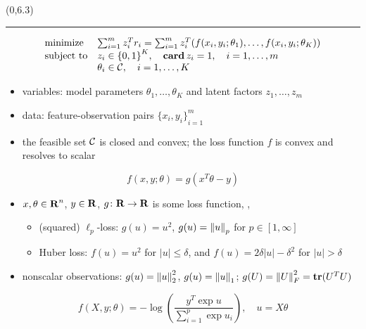 \documentclass[a0]{a0poster}
\begin{document}
\begin{textblock}{7}(0,6.3)
    \hrule\vspace*{0.5\baselineskip}

    \begin{equation}\label{prob:std_dlfm}
        \begin{array}{ll}
            \mbox{minimize} & \sum_{i = 1}^{m} z_i^T r_i = \sum_{i = 1}^{m} z_i^T (f(x_i, y_i; \theta_1), \ldots, f(x_i, y_i; \theta_K))\\
            \mbox{subject to} & z_i \in {\{0, 1\}}^K,\quad \mathop{\bf card} z_i = 1,\quad i = 1, \ldots, m\\
            & \theta_i \in {\cal C{}},\quad i = 1, \ldots, K
        \end{array}
    \end{equation}
    \begin{itemize}
        \item variables: model parameters $\theta_1, \ldots, \theta_K$ and latent factors $z_1, \ldots, z_m$
        \item data: feature-observation pairs ${\{x_i, y_i\}}_{i = 1}^m$
        \item the feasible set ${\cal C{}}$ is closed and convex; the loss function $f$ is convex and resolves to scalar
    \end{itemize}
        \[
            f(x, y; \theta) = g(x^T \theta - y)
        \]
        \begin{itemize}
            \item $x, \theta \in {\bf R{}}^n$, $y \in {\bf R{}}$, $g \colon {\bf R{}} \to {\bf R{}}$ is some loss function, \eg,
                \begin{itemize}
                    \item (squared) $\ell_p$-loss: $g(u) = u^2$, $g(u) = {\lVert u \rVert}_p$ for $p \in [1, \infty]$
                    \item Huber loss: $f(u) = u^2$ for $|u| \leq \delta$, and $f(u) = 2 \delta |u| - \delta^2$ for $|u| > \delta$
                \end{itemize}
            \item nonscalar observations: $g(u) = {\lVert u \rVert}_2^2$, $g(u) = {\lVert u \rVert}_1$; $g(U) = {\lVert U \rVert}_F^2 = \mathop{\bf tr}(U^T U)$
        \end{itemize}
    \[
        f(X, y; \theta) = -\log\left(\frac{y^T \exp u}{\sum_{i = 1}^{p} \exp u_i}\right),\quad u = X \theta
    \]
    \begin{itemize}

\end{itemize}
\end{textblock}
\end{document}
